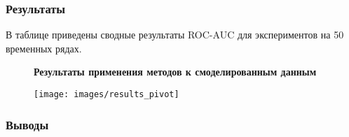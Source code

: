 \documentclass[intlimits, 9pt, unicode]{beamer}
\begin{document}
%
%
%


\begin{frame}
\frametitle{Результаты}

В таблице приведены сводные результаты ROC-AUC для экспериментов на 50 временных рядах.

\begin{figure}
\textbf{Результаты применения методов к смоделированным данным}\par\medskip
\texttt{[image: images/results\_pivot]}
\end{figure}


\end{frame}


\begin{frame}
\frametitle{Выводы}



\end{frame}
\end{document}
